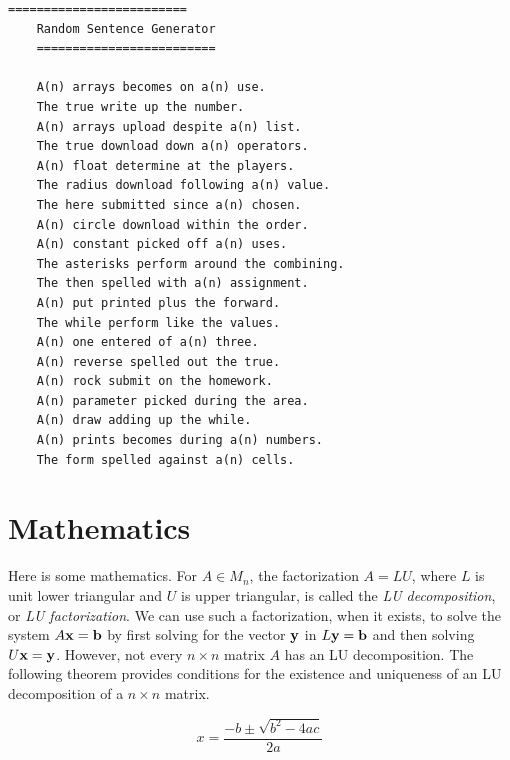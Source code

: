 \begin{Verbatim}[commandchars=\\\{\}]
	=========================
	Random Sentence Generator
	=========================
	
	A(n) arrays becomes on a(n) use.
	The true write up the number.
	A(n) arrays upload despite a(n) list.
	The true download down a(n) operators.
	A(n) float determine at the players.
	The radius download following a(n) value.
	The here submitted since a(n) chosen.
	A(n) circle download within the order.
	A(n) constant picked off a(n) uses.
	The asterisks perform around the combining.
	The then spelled with a(n) assignment.
	A(n) put printed plus the forward.
	The while perform like the values.
	A(n) one entered of a(n) three.
	A(n) reverse spelled out the true.
	A(n) rock submit on the homework.
	A(n) parameter picked during the area.
	A(n) draw adding up the while.
	A(n) prints becomes during a(n) numbers.
	The form spelled against a(n) cells.
\end{Verbatim}


\section*{Mathematics}\label{sec:lu}
Here is some mathematics.  For $A \in M_n$, the factorization $A = LU$, where $L$ is unit lower triangular and $U$ is upper triangular,  is called the \textit{LU decomposition}, or \textit{LU factorization}.  We can use such a factorization, when it exists, to solve the system $A {\bf x} = {\bf b}$ by first solving for the vector $\bf{y}$ in $L {\bf y} = {\bf b}$ 
and then solving 
$
U {\bf x} = {\bf y}
$. 
However, not every $n \times n$ matrix $A$ has an LU decomposition.  The following theorem provides conditions for the existence and uniqueness of an LU decomposition of a $n \times n$ matrix.

\begin{equation}\label{eqn:quad}
x = \frac{-b \pm \sqrt{b^2 - 4ac}}{2a}
\end{equation}
  

